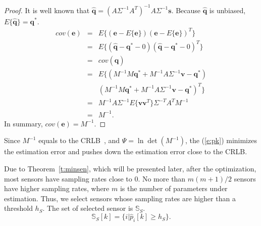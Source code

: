 \begin{proof}
    It is well known that $\mathbf{\hat{q}}=(A\Sigma^{-1} A^T)^{-1}A\Sigma^{-1}\mathbf{s}$.  %
  Because $\mathbf{\hat{q}}$ is unbiased, $E\{\mathbf{\hat{q}}\} = \mathbf{q}^\ast$.
\begin{eqnarray*}
 cov(\mathbf{e}) & = & E\{ (\mathbf{e}-E\{\mathbf{e}\})(\mathbf{e}-E\{\mathbf{e}\})^T\} \\
 &=& E\{(\mathbf{\hat{q}}-\mathbf{q}^\ast-0)(\mathbf{\hat{q}}-\mathbf{q}^\ast-0)^T \} \\
 &=& cov(\hat{\mathbf{q}}) \\
 &=&E\{(M^{-1}M\mathbf{q}^\ast + M^{-1}A\Sigma^{-1} \mathbf{v} -  \mathbf{q}^\ast) \\
    &&(M^{-1}M\mathbf{q}^\ast + M^{-1}A\Sigma^{-1} \mathbf{v} -  \mathbf{q}^\ast)^T \} \\
 &=& M^{-1}A\Sigma^{-1} E\{\mathbf{v}\mathbf{v}^T\} \Sigma^{-T} A^T M^{-1}\\
 &=& M^{-1}.
\end{eqnarray*}
    In summary, $cov(\mathbf{e}) = M^{-1}$.
\end{proof}

Since $M^{-1}$ equals to the CRLB~\cite{CheungLSTOA04,UcinskiOptDPS05}, and $\Psi=\ln\det(M^{-1})$, the (\ref{e:pk}) minimizes the estimation error and pushes down the estimation error close to the CRLB.



Due to Theorem~\ref{t:minsen}, which will be presented later, after the optimization, most sensors have sampling rates close to 0. No more than $m(m+1)/2$ sensors have higher sampling rates, where $m$ is the number of parameters under estimation. Thus, we select sensors whose sampling rates are higher than a threshold $h_S$. The set of selected sensor is $\mathbb{S}_S$.
\begin{equation*}\label{e:ss}
    \mathbb{S}_S [k] = \{i| \hat{p}_i[k] \geq h_S \}.
\end{equation*}

